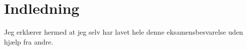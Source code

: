 \documentclass[a4]{article}
\begin{document}
        
    \setcounter{tocdepth}{2}
    \tableofcontents

    \newpage
    \section*{Indledning}
    Jeg erklærer hermed at jeg selv har lavet hele denne eksamensbesvarelse uden hjælp fra andre.

    \newpage
    
    
    \newpage
    

    \newpage
    

    \newpage
    
\end{document}
